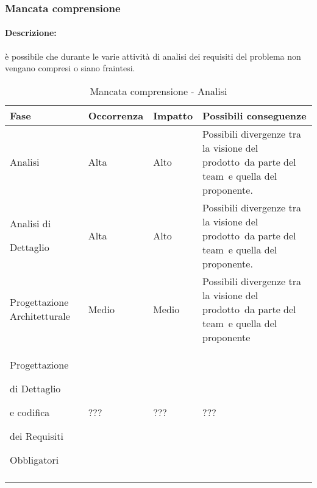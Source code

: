 \documentclass[../PianoProgetto.tex]{subfiles}
\begin{document}
\subsubsection{Mancata comprensione}
\label{sec:Mancata comprensione}

	\paragraph*{Descrizione:} è possibile che durante le varie attività di analisi dei requisiti del problema non vengano compresi o siano fraintesi.
	
	\hspace{0pt}
		\begin{longtabu} to \textwidth {X[.55] X[c .50] X[c .50] X}
			\toprule
			\textbf{Fase} & \textbf{Occorrenza} & \textbf{Impatto} & \textbf{Possibili conseguenze}\\
			\midrule
			\endhead
			
			Analisi & Alta & Alto & Possibili divergenze tra la visione del prodotto\g\ da parte del team\g\ e quella del proponente. \\
			\midrule
			Analisi di \par Dettaglio & Alta & Alto & Possibili divergenze tra la visione del prodotto\g\ da parte del team\g\ e quella del proponente.\\
			\midrule
			Progettazione Architetturale & Medio & Medio & Possibili divergenze tra la visione del prodotto\g\ da parte del team\g\ e quella del proponente \\
			\midrule
			Progettazione \par di Dettaglio \par e codifica \par dei Requisiti \par Obbligatori & ??? & ??? & ???\\
			\bottomrule
		
		\caption{Mancata comprensione - Analisi}
		\label{tab:Mancata comprensione - Analisi}	
	\end{longtabu}
		
\end{document}
